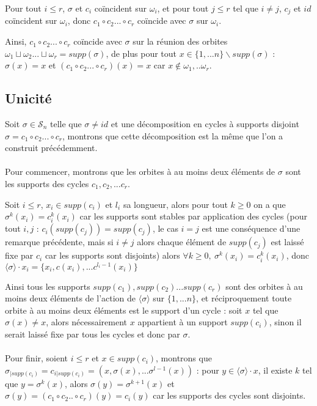 \documentclass[]{article}
\theoremstyle{remark}
\theoremstyle{definition}
\begin{document}
Pour tout $i \leqslant r$, $\sigma$ et $c_i$ coïncident sur $\omega_i$, et pour tout $j \leqslant r$ tel que $i \neq j$, $c_j$ et $id$ coïncident sur $\omega_i$, donc $c_1 \circ c_2 ... \circ c_r$ coïncide avec $\sigma$ sur $\omega_i$.

Ainsi, $c_1 \circ c_2 ... \circ c_r$ coïncide avec $\sigma$ sur la réunion des orbites $\omega_1 \sqcup \omega_2 ... \sqcup \omega_r = supp(\sigma)$, de plus pour tout $x \in \{1, ...n\} \backslash supp(\sigma)$ : $\sigma(x) = x$ et $(c_1 \circ c_2 ... \circ c_r)(x) = x$ car $x \notin \omega_1, ..\omega_r$.

\subsection{Unicité}

Soit $\sigma \in \mathscr{S}_n$ telle que $\sigma \neq id$ et une décomposition en cycles à supports disjoint $\sigma = c_1 \circ c_2 ... \circ c_r$, montrons que cette décomposition est la même que l'on a construit précédemment.

\paragraph*{}
Pour commencer, montrons que les orbites à au moins deux éléments de $\sigma$ sont les supports des cycles $c_1, c_2, ...c_r$.

Soit $i \leqslant r$, $x_i \in supp(c_i)$ et $l_i$ sa longueur, alors pour tout $k \geqslant 0$ on a que $\sigma^k(x_i) = c_i^k(x_i)$ car les supports sont stables par application des cycles (pour tout $i, j$ : $c_i(supp(c_j)) = supp(c_j)$, le cas $i=j$ est une conséquence d'une remarque précédente, mais si $i \neq j$ alors chaque élément de $supp(c_j)$ est laissé fixe par $c_i$ car les supports sont disjoints) alors $\forall k \geqslant 0, ~ \sigma^k(x_i) = c_i^k(x_i)$, donc $\langle \sigma \rangle \cdot x_i = \{x_i, c(x_i), ... c^{l_i - 1}(x_i)\}$

Ainsi tous les supports $supp(c_1), supp(c_2)...supp(c_r)$ sont des orbites à au moins deux éléments de l'action de $\langle \sigma \rangle$ sur $\{1, ...n\}$, et réciproquement toute orbite à au moins deux éléments est le support d'un cycle : soit $x$ tel que $\sigma(x) \neq x$, alors nécessairement $x$ appartient à un support $supp(c_i)$, sinon il serait laissé fixe par tous les cycles et donc par $\sigma$.

\paragraph*{}
Pour finir, soient $i \leqslant r$ et $x \in supp(c_i)$, montrons que $\sigma_{| supp(c_i)} = c_{i| supp(c_i)} = (x, \sigma(x), ... \sigma^{l-1}(x))$ : pour $y \in \langle \sigma \rangle \cdot x$, il existe $k$ tel que $y = \sigma^k(x)$, alors $\sigma(y) = \sigma^{k+1}(x)$ et $\sigma(y) = (c_1 \circ c_2 .. \circ c_r)(y) = c_i(y)$ car les supports des cycles sont disjoints.
\end{document}
